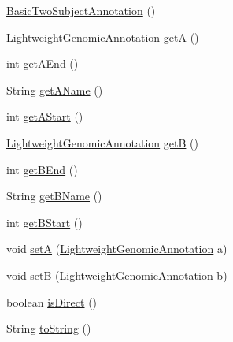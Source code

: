 \begin{DoxyCompactItemize}
\item 
\hyperlink{classbroad_1_1core_1_1annotation_1_1_basic_two_subject_annotation_ad4bdb0be335ea27d6f645c5a1168c784}{Basic\+Two\+Subject\+Annotation} ()
\item 
\hyperlink{interfacebroad_1_1core_1_1annotation_1_1_lightweight_genomic_annotation}{Lightweight\+Genomic\+Annotation} \hyperlink{classbroad_1_1core_1_1annotation_1_1_basic_two_subject_annotation_a2974021dd7ee2e275ba5de25259c8609}{get\+A} ()
\item 
int \hyperlink{classbroad_1_1core_1_1annotation_1_1_basic_two_subject_annotation_a8b278c9ac7ef63c5f79ee5279587747b}{get\+A\+End} ()
\item 
String \hyperlink{classbroad_1_1core_1_1annotation_1_1_basic_two_subject_annotation_a222bca0ebc983c0c2f6c338a1d5056cd}{get\+A\+Name} ()
\item 
int \hyperlink{classbroad_1_1core_1_1annotation_1_1_basic_two_subject_annotation_ab73cb7aae4bc1fc6202d7a46d69ee757}{get\+A\+Start} ()
\item 
\hyperlink{interfacebroad_1_1core_1_1annotation_1_1_lightweight_genomic_annotation}{Lightweight\+Genomic\+Annotation} \hyperlink{classbroad_1_1core_1_1annotation_1_1_basic_two_subject_annotation_a2769947c2df223c61063f225e204cb61}{get\+B} ()
\item 
int \hyperlink{classbroad_1_1core_1_1annotation_1_1_basic_two_subject_annotation_aac9158eb1a4e07482821f574b09e3e1e}{get\+B\+End} ()
\item 
String \hyperlink{classbroad_1_1core_1_1annotation_1_1_basic_two_subject_annotation_ad64cbcfbea531c45e3555f2d9e3f0ecb}{get\+B\+Name} ()
\item 
int \hyperlink{classbroad_1_1core_1_1annotation_1_1_basic_two_subject_annotation_aa6b5cecc4eb5cafcf177a4fba1d95577}{get\+B\+Start} ()
\item 
void \hyperlink{classbroad_1_1core_1_1annotation_1_1_basic_two_subject_annotation_af87993e07bf3337abc59714861e7b85c}{set\+A} (\hyperlink{interfacebroad_1_1core_1_1annotation_1_1_lightweight_genomic_annotation}{Lightweight\+Genomic\+Annotation} a)
\item 
void \hyperlink{classbroad_1_1core_1_1annotation_1_1_basic_two_subject_annotation_a4dd0d729f5d02072503264a9e5b0bca7}{set\+B} (\hyperlink{interfacebroad_1_1core_1_1annotation_1_1_lightweight_genomic_annotation}{Lightweight\+Genomic\+Annotation} b)
\item 
boolean \hyperlink{classbroad_1_1core_1_1annotation_1_1_basic_two_subject_annotation_a4997cb1a61a0bdde91a29211d3b4b463}{is\+Direct} ()
\item 
String \hyperlink{classbroad_1_1core_1_1annotation_1_1_basic_two_subject_annotation_aa476eb7734a2a7ab9d98ee9c2dfb85b5}{to\+String} ()
\end{DoxyCompactItemize}


